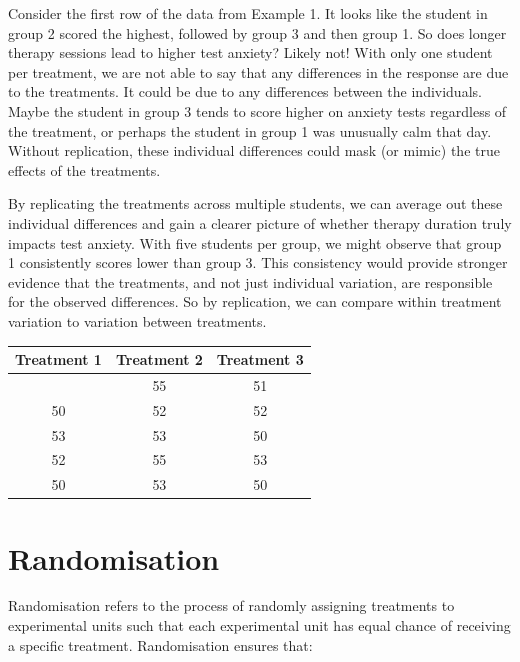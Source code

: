 \documentclass[
  letterpaper,
]{book}
\begin{document}
Consider the first row of the data from Example 1. It looks like the
student in group 2 scored the highest, followed by group 3 and then
group 1. So does longer therapy sessions lead to higher test anxiety?
Likely not! With only one student per treatment, we are not able to say
that any differences in the response are due to the treatments. It could
be due to any differences between the individuals. Maybe the student in
group 3 tends to score higher on anxiety tests regardless of the
treatment, or perhaps the student in group 1 was unusually calm that
day. Without replication, these individual differences could mask (or
mimic) the true effects of the treatments.

By replicating the treatments across multiple students, we can average
out these individual differences and gain a clearer picture of whether
therapy duration truly impacts test anxiety. With five students per
group, we might observe that group 1 consistently scores lower than
group 3. This consistency would provide stronger evidence that the
treatments, and not just individual variation, are responsible for the
observed differences. So by replication, we can compare within treatment
variation to variation between treatments.

\begin{longtable}[]{@{}ccc@{}}
\toprule\noalign{}
Treatment 1 & Treatment 2 & Treatment 3 \\
\midrule\noalign{}
\endhead
\bottomrule\noalign{}
\endlastfoot
48 & 55 & 51 \\
50 & 52 & 52 \\
53 & 53 & 50 \\
52 & 55 & 53 \\
50 & 53 & 50 \\
\end{longtable}

\section*{Randomisation}\label{randomisation}


Randomisation refers to the process of randomly assigning treatments to
experimental units such that each experimental unit has equal chance of
receiving a specific treatment. Randomisation ensures that:
\end{document}
